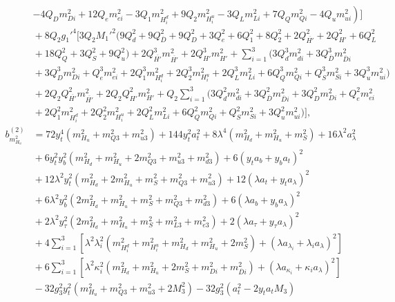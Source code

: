 \documentclass[preprint,amsmath,amssymb,aps,superscriptaddress,prd,showpacs,floatfix,nofootinbib]{revtex4-1}
\begin{document}
\begin{subequations}
\begin{align}
&{}\left.-4Q_Dm_{Di}^2+12Q_em_{ei}^2-3Q_1m_{H_i^d}^2+9Q_2m_{H_i^u}^2-3Q_Lm_{Li}^2+7Q_Qm_{Qi}^2-4Q_um_{ui}^2\right )\bigg ]\nonumber\\
&{}+8Q_2g_1'^4\bigg [ 3Q_2M_1'^2\big ( 9Q_d^2+9Q_{\overline{D}}^2+9Q_D^2+3Q_e^2+6Q_1^2+8Q_2^2+2Q_{\overline{H'}}^2+2Q_{H'}^2+6Q_L^2\nonumber\\
&{}+18Q_Q^2+3Q_S^2+9Q_u^2\big )+2Q_{\overline{H'}}^3m_{\overline{H'}}^2+2Q_{H'}^3m_{H'}^2+\sum_{i=1}^3\big ( 3Q_d^3m_{di}^2+3Q_{\overline{D}}^3m_{\overline{D}i}^2\nonumber\\
&{}+3Q_D^3m_{Di}^2+Q_e^3m_{ei}^2+2Q_1^3m_{H_i^d}^2+2Q_2^3m_{H_i^u}^2+2Q_L^3m_{Li}^2+6Q_Q^3m_{Qi}^2+Q_S^3m_{Si}^2+3Q_u^3m_{ui}^2\big )\nonumber\\
&{}+2Q_2Q_{\overline{H'}}^2m_{\overline{H'}}^2+2Q_2Q_{H'}^2m_{H'}^2+Q_2\sum_{i=1}^3\big ( 3Q_d^2m_{di}^2+3Q_{\overline{D}}^2m_{\overline{D}i}^2+3Q_D^2m_{Di}^2+Q_e^2m_{ei}^2\nonumber\\
&{}+2Q_1^2m_{H_i^d}^2+2Q_2^2m_{H_i^u}^2+2Q_L^2m_{Li}^2+6Q_Q^2m_{Qi}^2+Q_S^2m_{Si}^2+3Q_u^2m_{ui}^2\big )\bigg ],\label{eq:USSMmHu2BetaTwoLoop}\\
b_{m_{H_u}^2}^{(2)}&=72y_t^4\left ( m_{H_u}^2+m_{Q3}^2+m_{u3}^2\right )+144y_t^2a_t^2+8\lambda^4\left ( m_{H_d}^2+m_{H_u}^2+m_S^2\right )+16\lambda^2a_\lambda^2\nonumber\\
&{}+6y_t^2y_b^2\left ( m_{H_d}^2+m_{H_u}^2+2m_{Q3}^2+m_{u3}^2+m_{d3}^2\right )+6\left ( y_ta_b+y_ba_t\right )^2\nonumber\\
&{}+12\lambda^2y_t^2\left ( m_{H_d}^2+2m_{H_u}^2+m_S^2+m_{Q3}^2+m_{u3}^2\right )+12\left ( \lambda a_t+y_ta_\lambda\right )^2\nonumber\\
&{}+6\lambda^2y_b^2\left ( 2m_{H_d}^2+m_{H_u}^2+m_S^2+m_{Q3}^2+m_{d3}^2\right )+6\left ( \lambda a_b+y_ba_\lambda\right )^2\nonumber\\
&{}+2\lambda^2y_\tau^2\left ( 2m_{H_d}^2+m_{H_u}^2+m_S^2+m_{L3}^2+m_{e3}^2\right )+2\left ( \lambda a_\tau+y_\tau a_\lambda\right )^2\nonumber\\
&{}+4\sum_{i=1}^3 \left [ \lambda^2\lambda_i^2\left ( m_{H_i^d}^2+m_{H_i^u}^2+m_{H_d}^2+m_{H_u}^2+2m_S^2\right )+\left ( \lambda a_{\lambda_i}+\lambda_i a_{\lambda}\right )^2\right ] \nonumber\\
&{}+6\sum_{i=1}^3\left [ \lambda^2\kappa_i^2\left ( m_{H_d}^2+m_{H_u}^2+2m_S^2+m_{Di}^2+m_{\overline{D}i}^2\right )
+\left ( \lambda a_{\kappa_i}+\kappa_i a_\lambda\right )^2\right ]\nonumber\\
&{}-32g_3^2y_t^2\left ( m_{H_u}^2+m_{Q3}^2+m_{u3}^2+2M_3^2\right )-32g_3^2\left ( a_t^2-2y_ta_tM_3\right )\nonumber\\

\end{align}
\end{subequations}
\end{document}
